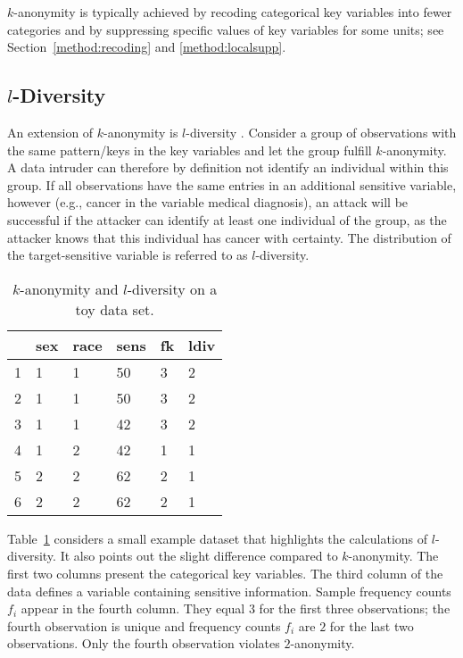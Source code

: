 \documentclass[12pt]{scrartcl}\usepackage[]{graphicx}\usepackage[]{color}
\begin{document}
$k$-anonymity is typically achieved by recoding categorical key variables into fewer categories and by suppressing specific values of key variables for some units; see Section~\ref{method:recoding} and \ref{method:localsupp}.

\subsection{$l$-Diversity}\label{method:l_diversity}
An extension of $k$-anonymity is $l$-diversity \citep{Machanava07}. Consider a group of observations with the same pattern/keys in the key variables and let the group fulfill $k$-anonymity. A data intruder can therefore by definition not identify an individual within this group. If all observations have the same entries in an additional sensitive variable, however (e.g., cancer in the variable medical diagnosis), an attack will be successful if the attacker can identify at least one individual of the group, as the attacker knows that this individual has cancer with certainty. The distribution of the target-sensitive variable is referred to as $l$-diversity.

\begin{small}
\begin{table}
\begin{center}
\caption{\label{listingFreq2}$k$-anonymity and $l$-diversity on a toy data set.}
\begin{tabular}{|l||ll|l|ll|}
\hline & sex & race & sens & fk & ldiv  \\
\hline
1  &  1  &  1  &  50  &     3    &        2 \\
2  &  1  &  1  &  50  &     3    &        2 \\
3  &  1  &  1  &  42  &     3    &        2 \\
4  &  1  &  2  &  42  &     1    &        1 \\
5  &  2  &  2  &  62  &     2    &        1 \\
6  &  2  &  2  &  62  &     2    &        1 \\
\hline
\end{tabular}
\end{center}
\end{table}
\end{small}

Table~\ref{listingFreq2} considers a small example dataset that highlights the calculations of $l$-diversity. It also points out the slight difference compared to $k$-anonymity. The first two columns present the categorical key variables. The third column of the data defines a variable containing sensitive information. Sample frequency counts $f_i$ appear in the fourth column. They equal $3$ for the first three observations; the fourth observation is unique and frequency counts $f_i$ are $2$ for the last two observations. Only the fourth observation violates $2$-anonymity.
\end{document}
